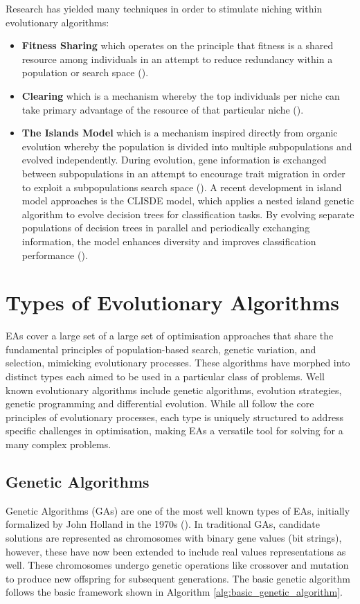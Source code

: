 \noindent Research has yielded many techniques in order to stimulate niching within evolutionary algorithms:
\begin{itemize}
	\item \textbf{Fitness Sharing} which operates on the principle that fitness is a shared resource among individuals in an attempt to reduce redundancy within a population or search space (\cite{back2012handbook}).
	\item \textbf{Clearing} which is a mechanism whereby the top individuals per niche can take primary advantage of the resource of that particular niche (\cite{back2012handbook}).
	\item \textbf{The Islands Model} which is a mechanism inspired directly from organic evolution whereby the population is divided into multiple subpopulations and evolved independently. During evolution, gene information is exchanged between subpopulations in an attempt to encourage trait migration in order to exploit a subpopulations search space (\cite{back2012handbook}). A recent development in island model approaches is the CLISDE model, which applies a nested island genetic algorithm to evolve decision trees for classification tasks. By evolving separate populations of decision trees in parallel and periodically exchanging information, the model enhances diversity and improves classification performance (\cite{cullinan2023clisde}).
\end{itemize}

\section{Types of Evolutionary Algorithms}\label{sec:ea_types_of_ea}
EAs cover a large set of a large set of optimisation approaches that share the fundamental principles of population-based search, genetic variation, and selection, mimicking evolutionary processes. These algorithms have morphed into distinct types each aimed to be used in a particular class of problems. Well known evolutionary algorithms include genetic algorithms, evolution strategies, genetic programming and differential evolution. While all follow the core principles of evolutionary processes, each type is uniquely structured to address specific challenges in optimisation, making EAs a versatile tool for solving for a many complex problems.

\subsection{Genetic Algorithms}\label{sec:genetic_algorithms}
Genetic Algorithms (GAs) are one of the most well known types of EAs, initially formalized by John Holland in the 1970s (\cite{mitchell1998introduction}). In traditional GAs, candidate solutions are represented as chromosomes with binary gene values (bit strings), however, these have now been extended to include real values representations as well. These chromosomes undergo genetic operations like crossover and mutation to produce new offspring for subsequent generations. The basic genetic algorithm follows the basic framework shown in Algorithm \ref{alg:basic_genetic_algorithm}.


